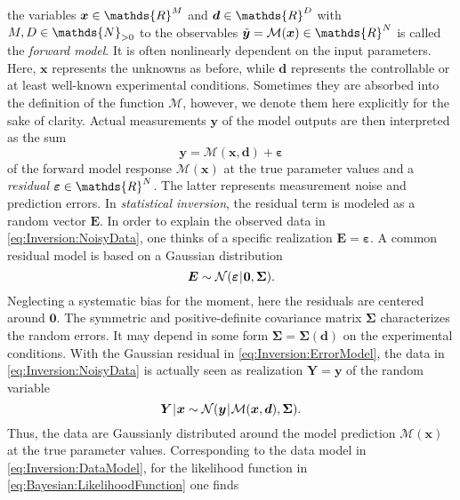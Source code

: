 the variables \(\bm{x} \in \mathds{R}^\dimParam\) and \(\bm{d} \in \mathds{R}^\dimControl\) with \(\dimParam,\dimControl \in \mathds{N}_{>0}\)
to the observables \(\tilde{\bm{y}} = \mathcal{M}(\bm{x}) \in \mathds{R}^\dimData\) is called the \emph{forward model}.
It is often nonlinearly dependent on the input parameters.
Here, \(\bm{x}\) represents the unknowns as before, while \(\bm{d}\) represents the controllable or at least well-known experimental conditions.
Sometimes they are absorbed into the definition of the function \(\mathcal{M}\), however, we denote them here explicitly for the sake of clarity.
Actual measurements \(\bm{y}\) of the model outputs are then interpreted as the sum
\begin{equation} \label{eq:Inversion:NoisyData}
  \bm{y} = \mathcal{M}(\bm{x},\bm{d}) + \bm{\varepsilon}
\end{equation}
of the forward model response \(\mathcal{M}(\bm{x})\) at the true parameter values and a \emph{residual} \(\bm{\varepsilon} \in \mathds{R}^\dimData\).
The latter represents measurement noise and prediction errors.
In \emph{statistical inversion}, the residual term is modeled as a random vector \(\bm{E}\).
In order to explain the observed data in \cref{eq:Inversion:NoisyData}, one thinks of a specific realization \(\bm{E} = \bm{\varepsilon}\).
A common residual model is based on a Gaussian distribution
\begin{equation} \label{eq:Inversion:ErrorModel}
  \bm{E} \sim \mathcal{N}(\bm{\varepsilon} {\:\!}|{\:\!} \bm{0}, \bm{\Sigma}).
\end{equation}
Neglecting a systematic bias for the moment, here the residuals are centered around \(\bm{0}\).
The symmetric and positive-definite covariance matrix \(\bm{\Sigma}\) characterizes the random errors.
It may depend in some form \(\bm{\Sigma} = \bm{\Sigma}(\bm{d})\) on the experimental conditions.
With the Gaussian residual in \cref{eq:Inversion:ErrorModel}, the data in \cref{eq:Inversion:NoisyData} is actually seen as realization \(\bm{Y} = \bm{y}\) of the random variable
\begin{equation} \label{eq:Inversion:DataModel}
  \bm{Y} {\:\!}|{\:\!} \bm{x} \sim \mathcal{N}(\bm{y} {\:\!}|{\:\!} \mathcal{M}(\bm{x},\bm{d}), \bm{\Sigma}).
\end{equation}
Thus, the data are Gaussianly distributed around the model prediction \(\mathcal{M}(\bm{x})\) at the true parameter values.
Corresponding to the data model in \cref{eq:Inversion:DataModel}, for the likelihood function in \cref{eq:Bayesian:LikelihoodFunction} one finds
